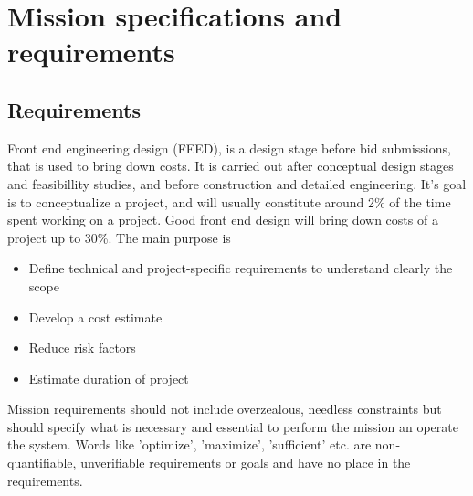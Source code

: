 \documentclass[../main.tex]{subfiles}
\begin{document}
	
	\chapter{Mission specifications and requirements}
	
	\section{Requirements}
	Front end engineering design (FEED), is a design stage before bid submissions, that is used to bring down costs. It is carried out after conceptual design stages and feasibillity studies, and before construction and detailed engineering. It's goal is to conceptualize a project, and will usually constitute around 2\% of the time spent working on a project. Good front end design will bring down costs of a project up to 30\%. The main purpose is
	\begin{itemize}
		\item Define technical and project-specific requirements to understand clearly the scope
		\item Develop a cost estimate
		\item Reduce risk factors
		\item Estimate duration of project
	\end{itemize}
	
	Mission requirements should not include overzealous, needless constraints but should specify what is necessary and essential to perform the mission an operate the system. Words like 'optimize', 'maximize', 'sufficient' etc. are non-quantifiable, unverifiable requirements or goals and have no place in the requirements.
	
\end{document}

